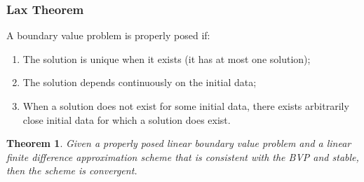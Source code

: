\documentclass{article}
\newtheorem{theorem}{Theorem}
\begin{document}
\subsubsection{Lax Theorem}
A boundary value problem is properly posed if:
\begin{enumerate}
    \item The solution is unique when it exists (it has at most one solution);
    \item The solution depends continuously on the initial data;
    \item When a solution does not exist for some initial data, there exists arbitrarily close initial data for which a solution does exist.
\end{enumerate}
\begin{theorem}
    Given a properly posed linear boundary value problem and a linear finite difference approximation scheme that is consistent with the BVP and stable, then the scheme is convergent.
\end{theorem}
\end{document}
